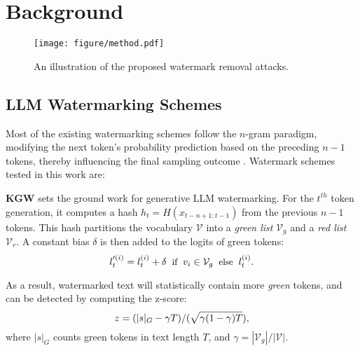 \section{Background}
\label{sec:background}
\begin{figure*}[t]
    \centering
    \texttt{[image: figure/method.pdf]}
    \caption{An illustration of the proposed watermark removal attacks. }
    \label{fig:method}
    \vspace{-10pt}
\end{figure*}
\subsection{LLM Watermarking Schemes} 
Most of the existing watermarking schemes follow the $n$-gram paradigm, modifying the next token's probability prediction based on the preceding $n-1$ tokens, thereby influencing the final sampling outcome \cite{liu2023survey,DBLP:conf/icml/KirchenbauerGWK23, zhao2023provable,Dathathri2024,liu2024a,liu2024an,lee2023wrote,hu2023unbiased,wu2023dipmark,aronsonpowerpoint, kuditipudi2023robust, pan2024waterseeker,liu2024preventing,lu2024entropy}. 
Watermark schemes tested in this work are:

\textbf{KGW} \cite{DBLP:conf/icml/KirchenbauerGWK23} sets the ground work for generative LLM watermarking. For the $t^{th}$ token generation, it computes a hash $h_t = H(x_{t-n+1:t-1})$ from the previous $n-1$ tokens. This hash partitions the vocabulary $\mathcal{V}$ into a \textit{green list} $\mathcal{V}_g$ and a \textit{red list} $\mathcal{V}_r$. A constant bias $\delta$ is then added to the logits of green tokens:
\begin{equation}
\small
l'^{(i)}_t = l^{(i)}_t + \delta \text{\; if \;} v_i \in \mathcal{V}_g \text{\; else \;} l^{(i)}_t.
\end{equation}

As a result, watermarked text will statistically contain more \textit{green} tokens, and can be detected by computing the z-score:
\begin{equation}
\small
z = (|s|_G - \gamma T)/(\sqrt{\gamma(1 - \gamma) T}),
\end{equation}
where $|s|_G$ counts green tokens in text length $T$, and $\gamma = |\mathcal{V}_g|/|\mathcal{V}|$.

